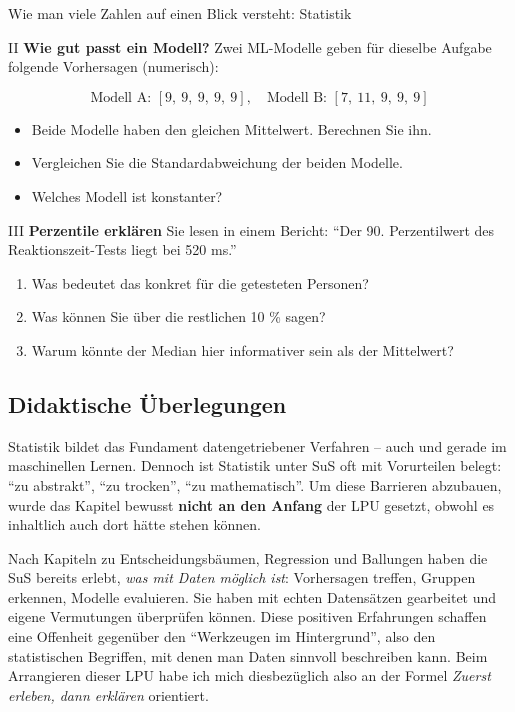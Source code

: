 \begin{lpu}{Wie man viele Zahlen auf einen Blick versteht: Statistik}
\begin{aufgabe}{II}
\textbf{Wie gut passt ein Modell?}  
Zwei ML-Modelle geben für dieselbe Aufgabe folgende Vorhersagen (numerisch):

\[
\text{Modell A: } [9,\ 9,\ 9,\ 9,\ 9], \quad \text{Modell B: } [7,\ 11,\ 9,\ 9,\ 9]
\]

\begin{itemize}
  \item Beide Modelle haben den gleichen Mittelwert. Berechnen Sie ihn.  
  \item Vergleichen Sie die Standardabweichung der beiden Modelle.
  \item Welches Modell ist konstanter?  
\end{itemize}
\end{aufgabe}

\begin{aufgabe}{III}
\textbf{Perzentile erklären}  
Sie lesen in einem Bericht:  
``Der 90. Perzentilwert des Reaktionszeit-Tests liegt bei 520 ms.''

\begin{enumerate}
  \item Was bedeutet das konkret für die getesteten Personen?  
  \item Was können Sie über die restlichen 10 \% sagen?  
  \item Warum könnte der Median hier informativer sein als der Mittelwert?
\end{enumerate}
\end{aufgabe}



\end{lpu}


\subsection*{Didaktische Überlegungen}

Statistik bildet das Fundament datengetriebener Verfahren – auch und gerade im maschinellen Lernen. Dennoch ist Statistik unter SuS oft mit Vorurteilen belegt: ``zu abstrakt'', ``zu trocken'', ``zu mathematisch''. Um diese Barrieren abzubauen, wurde das Kapitel bewusst \textbf{nicht an den Anfang} der LPU gesetzt, obwohl es inhaltlich auch dort hätte stehen können.

Nach Kapiteln zu Entscheidungsbäumen, Regression und Ballungen haben die SuS bereits erlebt, \emph{was mit Daten möglich ist}: Vorhersagen treffen, Gruppen erkennen, Modelle evaluieren. Sie haben mit echten Datensätzen gearbeitet und eigene Vermutungen überprüfen können. Diese positiven Erfahrungen schaffen eine Offenheit gegenüber den ``Werkzeugen im Hintergrund'', also den statistischen Begriffen, mit denen man Daten sinnvoll beschreiben kann. Beim Arrangieren dieser LPU habe ich mich diesbezüglich also an der Formel \emph{Zuerst erleben, dann erklären} orientiert.

